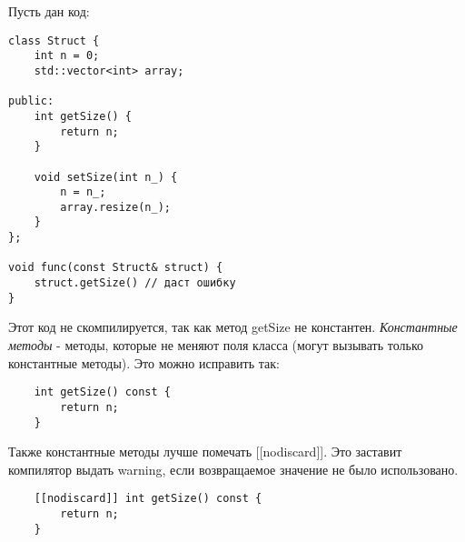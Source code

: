 Пусть дан код:

\begin{verbatim}
class Struct {
    int n = 0;
    std::vector<int> array;

public:
    int getSize() {
        return n;
    }

    void setSize(int n_) {
        n = n_;
        array.resize(n_);
    }
};

void func(const Struct& struct) {
    struct.getSize() // даст ошибку
}
\end{verbatim}

Этот код не скомпилируется, так как метод getSize не константен.
\textit{Константные методы} - методы, которые не меняют поля класса (могут вызывать только константные методы).
Это можно исправить так:

\begin{verbatim}
    int getSize() const {
        return n;
    }
\end{verbatim}

Также константные методы лучше помечать [[nodiscard]].
Это заставит компилятор выдать warning, если возвращаемое значение не было использовано.

\begin{verbatim}
    [[nodiscard]] int getSize() const {
        return n;
    }
\end{verbatim}